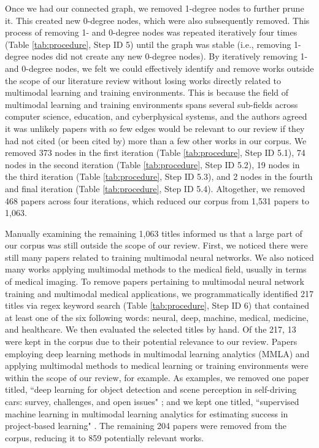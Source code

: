 \documentclass[manuscript,screen,review]{acmart}
\begin{document}
Once we had our connected graph, we removed 1-degree nodes to further prune it. This created new 0-degree nodes, which were also subsequently removed. This process of removing 1- and 0-degree nodes was repeated iteratively four times (Table \ref{tab:procedure}, Step ID 5) until the graph was stable (i.e., removing 1-degree nodes did not create any new 0-degree nodes). By iteratively removing 1- and 0-degree nodes, we felt we could effectively identify and remove works outside the scope of our literature review without losing works directly related to multimodal learning and training environments. This is because the field of multimodal learning and training environments spans several sub-fields across computer science, education, and cyberphysical systems, and the authors agreed it was unlikely papers with so few edges would be relevant to our review if they had not cited (or been cited by) more than a few other works in our corpus. We removed 373 nodes in the first iteration (Table \ref{tab:procedure}, Step ID 5.1), 74 nodes in the second iteration (Table \ref{tab:procedure}, Step ID 5.2), 19 nodes in the third iteration (Table \ref{tab:procedure}, Step ID 5.3), and 2 nodes in the fourth and final iteration (Table \ref{tab:procedure}, Step ID 5.4). Altogether, we removed 468 papers across four iterations, which reduced our corpus from 1,531 papers to 1,063. 

Manually examining the remaining 1,063 titles informed us that a large part of our corpus was still outside the scope of our review. First, we  noticed there were still many papers related to training multimodal neural networks. We also noticed many works applying multimodal methods to the medical field, usually in terms of medical imaging. To remove papers pertaining to multimodal neural network training and multimodal medical applications, we programmatically identified 217 titles via regex keyword search (Table \ref{tab:procedure}, Step ID 6) that contained at least one of the six following words: neural, deep, machine, medical, medicine, and healthcare. We then evaluated the selected titles by hand. Of the 217, 13 were kept in the corpus due to their potential relevance to our review. Papers employing deep learning methods in multimodal learning analytics (MMLA) and applying multimodal methods to medical learning or training environments were within the scope of our review, for example. As examples, we removed one paper titled, ``deep learning for object detection and scene perception in self-driving cars: survey, challenges, and open issues" \cite{gupta2021deep}; and we kept one titled, ``supervised machine learning in multimodal learning analytics for estimating success in project‐based learning" \cite{spikol2018supervised}. The remaining 204 papers were removed from the corpus, reducing it to 859 potentially relevant works.
\end{document}
